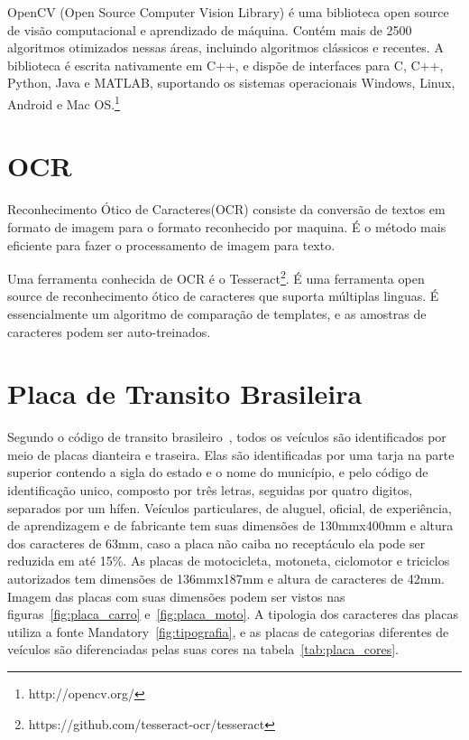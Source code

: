 OpenCV (Open Source Computer Vision Library) é uma biblioteca open source de
visão computacional e aprendizado de máquina. Contém mais de 2500 algoritmos
otimizados nessas áreas, incluindo algoritmos clássicos e recentes. A biblioteca
é escrita nativamente em C++, e dispõe de interfaces para C, C++, Python, Java e
MATLAB, suportando os sistemas operacionais Windows, Linux, Android e Mac
OS.\footnote{http://opencv.org/}

\section{OCR}
\label{sec:ocr}

Reconhecimento Ótico de Caracteres(OCR) consiste da conversão de textos em
formato de imagem para o formato reconhecido por maquina. É o método mais
eficiente para fazer o processamento de imagem para
texto.~\cite{mohit2015designing}

Uma ferramenta conhecida de OCR é o
Tesseract\footnote{https://github.com/tesseract-ocr/tesseract}. É uma ferramenta
open source de reconhecimento ótico de caracteres que suporta múltiplas linguas.
É essencialmente um algoritmo de comparação de templates, e as amostras de
caracteres podem ser auto-treinados.~\cite{ho2016intelligent}

\section{Placa de Transito Brasileira}

Segundo o código de transito brasileiro~\cite{brasil1997lei}, todos os veículos
são identificados por meio de placas dianteira e traseira.  Elas são
identificadas por uma tarja na parte superior contendo a sigla do estado e o
nome do município, e pelo código de identificação unico, composto por três
letras, seguidas por quatro digitos, separados por um hífen. Veículos
particulares, de aluguel, oficial, de experiência, de aprendizagem e de
fabricante tem suas dimensões de 130mmx400mm e altura dos caracteres de 63mm,
caso a placa não caiba no receptáculo ela pode ser reduzida em até 15\%. As
placas de motocicleta, motoneta, ciclomotor e triciclos autorizados tem
dimensões de 136mmx187mm e altura de caracteres de 42mm. Imagem das placas com
suas dimensões podem ser vistos nas figuras~\ref{fig:placa_carro}
e~\ref{fig:placa_moto}. A tipologia dos caracteres das placas utiliza a fonte
Mandatory~\ref{fig:tipografia}, e as placas de categorias diferentes de
veículos são diferenciadas pelas suas cores na tabela~\ref{tab:placa_cores}.

